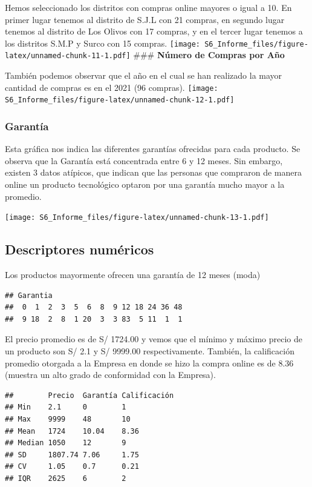 \documentclass[
]{article}
\begin{document}
Hemos seleccionado los distritos con compras online mayores o igual a
10. En primer lugar tenemos al distrito de S.J.L con 21 compras, en
segundo lugar tenemos al distrito de Los Olivos con 17 compras, y en el
tercer lugar tenemos a los distritos S.M.P y Surco con 15 compras.
\texttt{[image: S6\_Informe\_files/figure-latex/unnamed-chunk-11-1.pdf]}
\#\#\# \textbf{Número de Compras por Año}

También podemos observar que el año en el cual se han realizado la mayor
cantidad de compras es en el 2021 (96 compras).
\texttt{[image: S6\_Informe\_files/figure-latex/unnamed-chunk-12-1.pdf]}

\hypertarget{garantuxeda}{%
\subsubsection{\texorpdfstring{\textbf{Garantía}}{Garantía}}\label{garantuxeda}}

Esta gráfica nos indica las diferentes garantías ofrecidas para cada
producto. Se observa que la Garantía está concentrada entre 6 y 12
meses. Sin embargo, existen 3 datos atípicos, que indican que las
personas que compraron de manera online un producto tecnológico optaron
por una garantía mucho mayor a la promedio.

\texttt{[image: S6\_Informe\_files/figure-latex/unnamed-chunk-13-1.pdf]}

\hypertarget{descriptores-numuxe9ricos}{%
\subsection{\texorpdfstring{\textbf{Descriptores
numéricos}}{Descriptores numéricos}}\label{descriptores-numuxe9ricos}}

Los productos mayormente ofrecen una garantía de 12 meses (moda)

\begin{verbatim}
## Garantia
##  0  1  2  3  5  6  8  9 12 18 24 36 48 
##  9 18  2  8  1 20  3  3 83  5 11  1  1
\end{verbatim}

El precio promedio es de S/ 1724.00 y vemos que el mínimo y máximo
precio de un producto son S/ 2.1 y S/ 9999.00 respectivamente. También,
la calificación promedio otorgada a la Empresa en donde se hizo la
compra online es de 8.36 (muestra un alto grado de conformidad con la
Empresa).

\begin{verbatim}
##        Precio  Garantía Calificación
## Min    2.1     0        1           
## Max    9999    48       10          
## Mean   1724    10.04    8.36        
## Median 1050    12       9           
## SD     1807.74 7.06     1.75        
## CV     1.05    0.7      0.21        
## IQR    2625    6        2
\end{verbatim}
\end{document}
